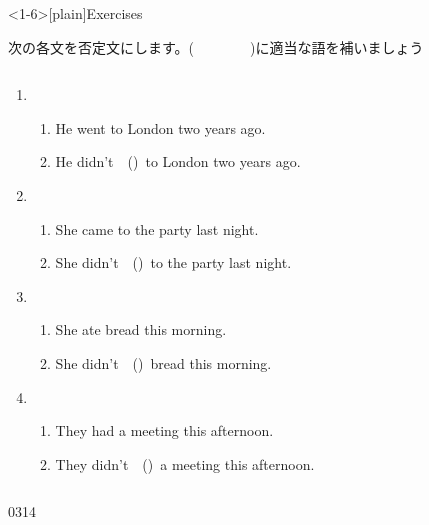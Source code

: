 \documentclass[aspectratio=169,xcolor={dvipsnames,table}]{beamer}
\newcommand{\myaudio}[1]{\href{#1}{\faVolumeUp}}
\begin{document}
\begin{frame}<1-6>[plain]{Exercises}

 {\small 次の各文を否定文にします。(~~~~~~~~)に適当な語を補いましょう}

\begin{columns}
\begin{column}{.6\textwidth}
\begin{enumerate}
 \item \begin{enumerate}
	\item He went to London two years ago.
	\item He didn't~~()\,\,\,to London two years ago.
       \end{enumerate}
 \item \begin{enumerate}
	\item She came to the party last night.
	\item She didn't~~()\,\,\,to the party last night.
       \end{enumerate}
 \item \begin{enumerate}
	\item She ate bread this morning.
	\item She didn't~~()\,\,\,bread this morning.
       \end{enumerate}
 \item \begin{enumerate}
	\item They had a meeting this afternoon.
	\item They didn't~~()\,\,\,a meeting this afternoon.
       \end{enumerate}
\end{enumerate}
\end{column}
\begin{column}{.35\textwidth}
%
\end{column}
\end{columns}
\hfill{\tiny 0314}\,{\scriptsize \myaudio{./audio/026_past_didnot_06.mp3}}

\end{frame}
\end{document}
